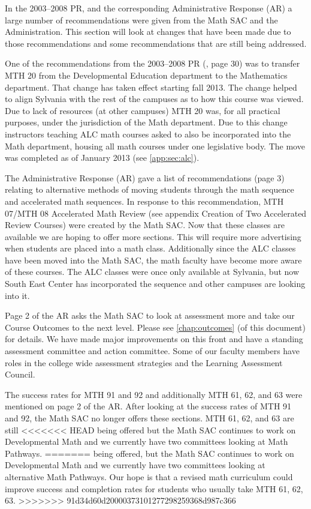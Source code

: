 In the 2003--2008 PR, and the corresponding Administrative
Response (AR) a large number of recommendations were given from the Math SAC and
the Administration.  This section will look at changes that have been made due
to those recommendations and some recommendations that are still being
addressed.

One of the recommendations from the 2003--2008 PR (\cite{mathprogramreview2003}, page 30) was to transfer MTH
20 from the Developmental Education department to the Mathematics department.
That change has taken effect starting fall 2013.  The change helped to align
Sylvania with the rest of the campuses as to how this course was viewed.   Due
to lack of resources (at other campuses) MTH 20 was, for all practical purposes,
under the jurisdiction of the Math department.  Due to this change instructors
teaching ALC math courses asked to also be incorporated into the Math
department, housing all math courses under one legislative body.  The move was
completed as of January 2013 (see \vref{app:sec:alc}).

The Administrative Response (AR) gave a list of recommendations (page 3) relating to alternative methods
of moving students through the math sequence and accelerated math sequences.  In
response to this recommendation, MTH 07/MTH 08 Accelerated Math Review (see appendix
 Creation of Two Accelerated Review Courses) were created by the Math SAC.
Now that these classes are available we are hoping to offer more sections.  This
will require more advertising when students are placed into a math class.
Additionally since the ALC classes have been moved into the Math SAC, the math
faculty have become more aware of these courses.  The ALC classes were once only
available at Sylvania, but now South East Center has incorporated the sequence
and other campuses are looking into it.

Page 2 of the AR asks the Math SAC to look at assessment more and take our
Course Outcomes to the next level.  Please see \vref{chap:outcomes} (of this
document) for
details.  We have made major improvements on this front and have a standing
assessment committee and action committee.  Some of our faculty members have
roles in the college wide assessment strategies and the Learning Assessment Council.

The success rates for MTH 91 and 92 and additionally MTH 61, 62, and 63 were
mentioned on page 2 of the AR.  After looking at the success rates of MTH 91 and
92, the Math SAC no longer offers these sections.   MTH 61, 62, and 63 are still
<<<<<<< HEAD
being offered but the Math SAC continues to work on Developmental Math and we
currently have two committees looking at Math Pathways.
=======
being offered, but the Math SAC continues to work on Developmental Math and we
currently have two committees looking at alternative Math Pathways. Our hope is that a revised math curriculum could improve success and completion rates for students who usually take MTH 61, 62, 63. 
>>>>>>> 91d34d60d20000373101277298259368d987c366

